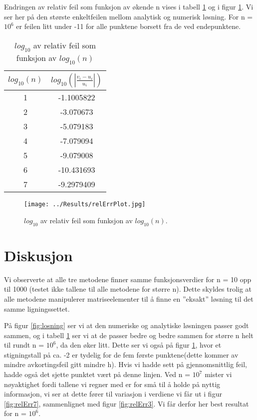 \documentclass[reprint,english,notitlepage]{revtex4-1}
\begin{document}
	Endringen av relativ feil som funksjon av økende n vises i tabell \ref{tab:relErr} og i figur \ref{fig:relErrPlot}. Vi ser her på den største enkeltfeilen mellom analytisk og numerisk løsning. For n = $10^6$ er feilen litt under -11 for alle punktene borsett fra de ved endepunktene.
	
	\begin{table}[H]
		\begin{center}
			\caption{$log_{10}$ av relativ feil som funksjon av $log_{10}(n)$}
			\label{tab:relErr}
			\begin{tabular}{|c|c|} \hline
				\textbf{$log_{10}(n)$} & $log_{10}(|\frac{v_i - u_i}{u_i}|)$ \\ \hline
				1 & -1.1005822 \\
				2 & -3.070673 \\
				3 & -5.079183 \\
				4 & -7.079094 \\
				5 & -9.079008 \\
				6 & -10.431693 \\
				7 & -9.2979409 \\ \hline
			\end{tabular}
		\end{center}
	\end{table}
	
	\begin{figure}[H]
		\texttt{[image: ../Results/relErrPlot.jpg]}
		\caption{$log_{10}$ av relativ feil som funksjon av $log_{10}(n)$.}
		\label{fig:relErrPlot}
	\end{figure}
	
\section{Diskusjon} %
	Vi observerte at alle tre metodene finner samme funksjonsverdier for n = 10 opp til 1000 (testet ikke tallene til alle metodene for større n). Dette skyldes trolig at alle metodene manipulerer matriseelementer til å finne en ''eksakt'' løsning til det samme ligningssettet.
	
	På figur \ref{fig:losning} ser vi at den numeriske og analytiske løsningen passer godt sammen, og i tabell \ref{tab:relErr} ser vi at de passer bedre og bedre sammen for større n helt til rundt n = $10^6$, da den øker litt. Dette ser vi også på figur \ref{fig:relErrPlot}, hvor et stigningstall på ca. -2 er tydelig for de fem første punktene(dette kommer av mindre avkortingsfeil gitt mindre h). Hvis vi hadde sett på gjennomsnittlig feil, hadde også det sjette punktet vært på denne linjen. Ved n = $10^7$ mister vi nøyaktighet fordi tallene vi regner med er for små til å holde på nyttig informasjon, vi ser at dette fører til variasjon i verdiene vi får ut i figur \ref{fig:relErr7}, sammenlignet med figur \ref{fig:relErr3}. Vi får derfor her best resultat for n = $10^6$.
	
\end{document}
